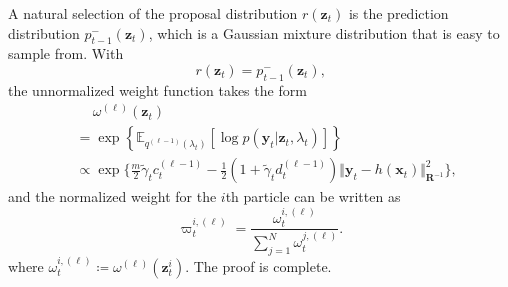 \documentclass[10pt,twocolumn,twoside]{IEEEtran}
\newcommand{\e}[1]{\exp\left\{#1\right\}}
\newcommand{\E}[2][]{ \mathbb{E}_{#1}\left[#2\right] } %
\newcommand{\cm}{\text{,}} %
\newcommand{\fs}{\text{.}} %
\newcommand{\x}{{ \bm{x} }}
\newcommand{\y}{{ \bm{y} }}
\newcommand{\z}{{ \bm{z} }}
\begin{document}
\begin{appendices}
A natural selection of the proposal distribution $r(\z_t)$ is the prediction distribution $p_{t-1}^-(\z_t)$, which is a Gaussian mixture distribution that is easy to sample from. With 
$$r(\z_t) = p_{t-1}^-(\z_t)\cm$$
the unnormalized weight function takes the form 
\begin{equation*}
\begin{split}
    &~\quad\omega^{(\ell)}(\z_t) \\
    &= \e{\E[q^{(\ell-1)}(\lambda_t)]{\log{p(\y_t|\z_t,\lambda_t)}}} \\
    &\propto \exp\{\tfrac{m}{2}\tilde\gamma_tc_t^{(\ell-1)} - \tfrac{1}{2}(1+\tilde\gamma_td_t^{(\ell-1)})\Vert\y_t-h(\x_t)\Vert^2_{\bm{R}^{-1}}\} \cm
\end{split}
\end{equation*}
and the normalized weight for the $i$th particle can be written as
$$
\varpi_t^{i,(\ell)} = \frac{\omega_t^{i,(\ell)}}{\sum_{j=1}^N\omega_t^{j,(\ell)}} \fs
$$
where $\omega_t^{i,(\ell)}\coloneqq\omega^{(\ell)}(\z_t^i)$. The proof is complete.



\end{appendices}
\end{document}
